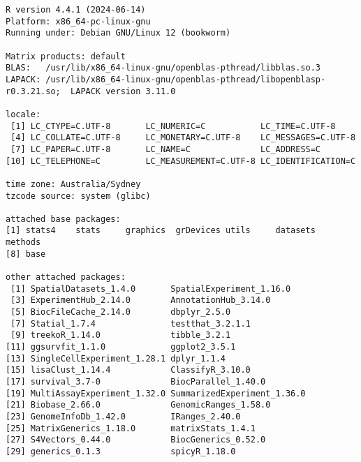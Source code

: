 \documentclass[
  letterpaper,
  DIV=11,
  numbers=noendperiod]{scrreprt}
\begin{document}
\begin{verbatim}
R version 4.4.1 (2024-06-14)
Platform: x86_64-pc-linux-gnu
Running under: Debian GNU/Linux 12 (bookworm)

Matrix products: default
BLAS:   /usr/lib/x86_64-linux-gnu/openblas-pthread/libblas.so.3 
LAPACK: /usr/lib/x86_64-linux-gnu/openblas-pthread/libopenblasp-r0.3.21.so;  LAPACK version 3.11.0

locale:
 [1] LC_CTYPE=C.UTF-8       LC_NUMERIC=C           LC_TIME=C.UTF-8       
 [4] LC_COLLATE=C.UTF-8     LC_MONETARY=C.UTF-8    LC_MESSAGES=C.UTF-8   
 [7] LC_PAPER=C.UTF-8       LC_NAME=C              LC_ADDRESS=C          
[10] LC_TELEPHONE=C         LC_MEASUREMENT=C.UTF-8 LC_IDENTIFICATION=C   

time zone: Australia/Sydney
tzcode source: system (glibc)

attached base packages:
[1] stats4    stats     graphics  grDevices utils     datasets  methods  
[8] base     

other attached packages:
 [1] SpatialDatasets_1.4.0       SpatialExperiment_1.16.0   
 [3] ExperimentHub_2.14.0        AnnotationHub_3.14.0       
 [5] BiocFileCache_2.14.0        dbplyr_2.5.0               
 [7] Statial_1.7.4               testthat_3.2.1.1           
 [9] treekoR_1.14.0              tibble_3.2.1               
[11] ggsurvfit_1.1.0             ggplot2_3.5.1              
[13] SingleCellExperiment_1.28.1 dplyr_1.1.4                
[15] lisaClust_1.14.4            ClassifyR_3.10.0           
[17] survival_3.7-0              BiocParallel_1.40.0        
[19] MultiAssayExperiment_1.32.0 SummarizedExperiment_1.36.0
[21] Biobase_2.66.0              GenomicRanges_1.58.0       
[23] GenomeInfoDb_1.42.0         IRanges_2.40.0             
[25] MatrixGenerics_1.18.0       matrixStats_1.4.1          
[27] S4Vectors_0.44.0            BiocGenerics_0.52.0        
[29] generics_0.1.3              spicyR_1.18.0              


\end{verbatim}
\end{document}
